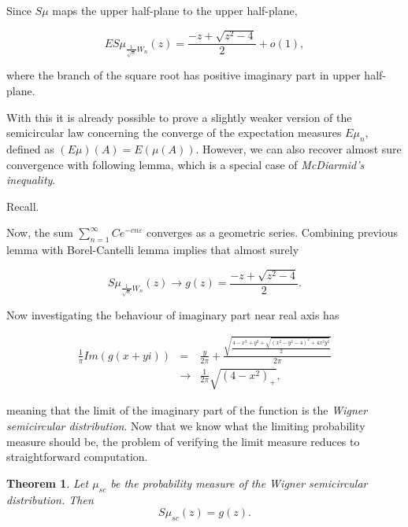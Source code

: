 \documentclass[12pt,a4paper,leqno]{report}
\theoremstyle{plain}
\newtheorem{theo}[equation]{Theorem}
\theoremstyle{definition}
\theoremstyle{remark}
\begin{document}
Since $S\mu$ maps the upper half-plane to the upper half-plane,  

\begin{equation*}
ES\mu_{\frac{1}{\sqrt{n}}W_n}(z) = \frac{-z + \sqrt{z^2 - 4}}{2} +o(1),
\end{equation*}

where the branch of the square root has positive imaginary part in upper half-plane.

With this it is already possible to prove a slightly weaker version of the semicircular law concerning the converge of the expectation measures $E\mu_n$, defined as $(E\mu)(A) = E(\mu(A))$. However, we can also recover almost sure convergence with following lemma, which is a special case of \emph{McDiarmid's inequality}.

Recall.

Now, the sum $\sum_{n=1}^{\infty} Ce^{-cn\varepsilon}$ converges as a geometric series. Combining previous lemma with Borel-Cantelli lemma implies that almost surely

\begin{equation*}
S\mu_{\frac{1}{\sqrt{n}}W_n}(z) \to g(z) = \frac{-z + \sqrt{z^2-4}}{2}.
\end{equation*}

Now investigating the behaviour of imaginary part near real axis has

\begin{eqnarray*}
\frac{1}{\pi} Im(g(x+yi)) & = &
\frac{y}{2\pi} + \frac{\sqrt{\frac{4-x^2+y^2+\sqrt{(x^2-y^2-4)^2+4x^2y^2}}{2}}}{2\pi}\\
& \to & \frac{1}{2\pi} \sqrt{(4-x^2)_+},
\end{eqnarray*}

meaning that the limit of the imaginary part of the function is the \emph{Wigner semicircular distribution}. Now that we know what the limiting probability measure should be, the problem of verifying the limit measure reduces to straightforward computation.

\begin{theo}
Let $\mu_{sc}$ be the probability measure of the Wigner semicircular distribution. Then
\begin{equation*}
S\mu_{sc}(z) = g(z).
\end{equation*}
\end{theo}
\end{document}
